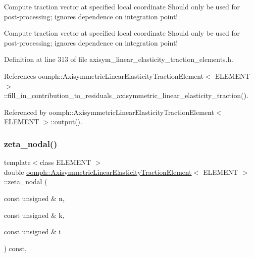 Compute traction vector at specified local coordinate Should only be used for post-\/processing; ignores dependence on integration point! 

Compute traction vector at specified local coordinate Should only be used for post-\/processing; ignores dependence on integration point! 

Definition at line 313 of file axisym\+\_\+linear\+\_\+elasticity\+\_\+traction\+\_\+elements.\+h.



References oomph\+::\+Axisymmetric\+Linear\+Elasticity\+Traction\+Element$<$ E\+L\+E\+M\+E\+N\+T $>$\+::fill\+\_\+in\+\_\+contribution\+\_\+to\+\_\+residuals\+\_\+axisymmetric\+\_\+linear\+\_\+elasticity\+\_\+traction().



Referenced by oomph\+::\+Axisymmetric\+Linear\+Elasticity\+Traction\+Element$<$ E\+L\+E\+M\+E\+N\+T $>$\+::output().

\mbox{\label{classoomph_1_1AxisymmetricLinearElasticityTractionElement_a1eeca70977b3ba93cffc2d811b054a9a}} 
\subsubsection{\texorpdfstring{zeta\+\_\+nodal()}{zeta\_nodal()}}
{\footnotesize\ttfamily template$<$class E\+L\+E\+M\+E\+NT $>$ \\
double \hyperlink{classoomph_1_1AxisymmetricLinearElasticityTractionElement}{oomph\+::\+Axisymmetric\+Linear\+Elasticity\+Traction\+Element}$<$ E\+L\+E\+M\+E\+NT $>$\+::zeta\+\_\+nodal (\begin{DoxyParamCaption}\item[{const unsigned \&}]{n,  }\item[{const unsigned \&}]{k,  }\item[{const unsigned \&}]{i }\end{DoxyParamCaption}) const\hspace{0.3cm}{\ttfamily [inline]}, {\ttfamily [virtual]}}



